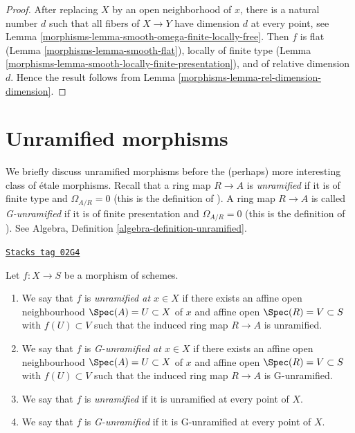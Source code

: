 \begin{proof}

After replacing $X$ by an open neighborhood of $x$,
there is a natural number $d$ such that all fibers
of $X \to Y$ have dimension $d$ at every point, see
Lemma \ref{morphisms-lemma-smooth-omega-finite-locally-free}.
Then $f$ is flat (Lemma \ref{morphisms-lemma-smooth-flat}),
locally of finite type (Lemma \ref{morphisms-lemma-smooth-locally-finite-presentation}),
and of relative dimension $d$. Hence the result follows from
Lemma \ref{morphisms-lemma-rel-dimension-dimension}.
\end{proof}

\section{Unramified morphisms}
\label{morphisms-section-unramified}
We briefly discuss unramified morphisms before the (perhaps) more interesting
class of \'etale morphisms. Recall that a ring map $R \to A$ is {\it unramified}
if it is of finite type and $\Omega_{A/R} = 0$ (this is the definition
of \cite{Henselian}). A ring map $R \to A$ is called {\it G-unramified} if it
is of finite presentation and $\Omega_{A/R} = 0$ (this is the definition of
\cite{EGA}). See
Algebra, Definition \ref{algebra-definition-unramified}.

\begin{definition}[Unramified]
\label{morphisms-definition-unramified}
\href{https://stacks.math.columbia.edu/tag/02G4}{\texttt{Stacks tag 02G4}}

Let $f : X \to S$ be a morphism of schemes.
\begin{enumerate}
\item We say that $f$ is {\it unramified at $x \in X$} if
there exists an affine open neighbourhood $\Spec(A) = U \subset X$
of $x$ and affine open $\Spec(R) = V \subset S$
with $f(U) \subset V$ such that the induced ring map
$R \to A$ is unramified.
\item We say that $f$ is {\it G-unramified at $x \in X$} if
there exists an affine open neighbourhood $\Spec(A) = U \subset X$
of $x$ and affine open $\Spec(R) = V \subset S$
with $f(U) \subset V$ such that the induced ring map
$R \to A$ is G-unramified.
\item We say that $f$ is {\it unramified} if it is unramified
at every point of $X$.
\item We say that $f$ is {\it G-unramified} if it is G-unramified
at every point of $X$.
\end{enumerate}
\end{definition}

